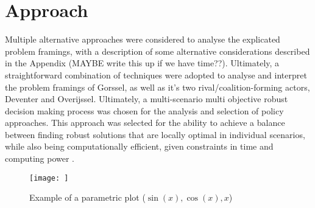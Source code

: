 \section{Approach}
\label{s:approach}


Multiple alternative approaches were considered to analyse the explicated problem framings, with a description of some alternative considerations described in the Appendix (MAYBE write this up if we have time??). Ultimately, a straightforward combination of techniques were adopted to analyse and interpret the problem framings of Gorssel, as well as it's two rival/coalition-forming actors, Deventer and Overijssel. Ultimately, a multi-scenario multi objective robust decision making process was chosen for the analysis and selection of policy approaches. This approach was selected for the ability to achieve a balance between finding robust solutions that are locally optimal in individual scenarios, while also being computationally efficient, given constraints in time and computing power \parencite{bartholomew_considering_2020}.

\begin{figure}[h]
\caption{Example of a parametric plot ($\sin (x), \cos(x), x$)}
\centering
\texttt{[image: ]}
\end{figure}


